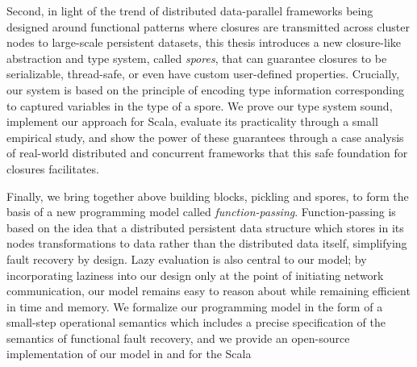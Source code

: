 Second, in light of the trend of distributed data-parallel frameworks
being designed around functional patterns where closures are transmitted across
cluster nodes to large-scale persistent datasets, this thesis introduces a new
closure-like abstraction and type system, called {\em spores}, that can
guarantee closures to be serializable, thread-safe, or even have custom
user-defined properties. Crucially, our system is based on the principle of
encoding type information corresponding to captured variables in the type of a
spore. We prove our type system sound, implement our approach for Scala,
evaluate its practicality through a small empirical study, and show the power of
these guarantees through a case analysis of real-world distributed and
concurrent frameworks that this safe foundation for closures facilitates.

\vspace{0.2cm}

Finally, we bring together above building blocks, pickling and spores, to form
the basis of a new programming model called {\em function-passing}.
Function-passing is based on the idea that a distributed persistent data
structure which stores in its nodes transformations to data rather than the
distributed data itself, simplifying fault recovery by design. Lazy evaluation
is also central to our model; by incorporating laziness into our design only at
the point of initiating network communication, our model remains easy to reason
about while remaining efficient in time and memory. We formalize our programming
model in the form of a small-step operational semantics which includes a precise
specification of the semantics of functional fault recovery, and we provide an
open-source implementation of our model in and for the Scala











